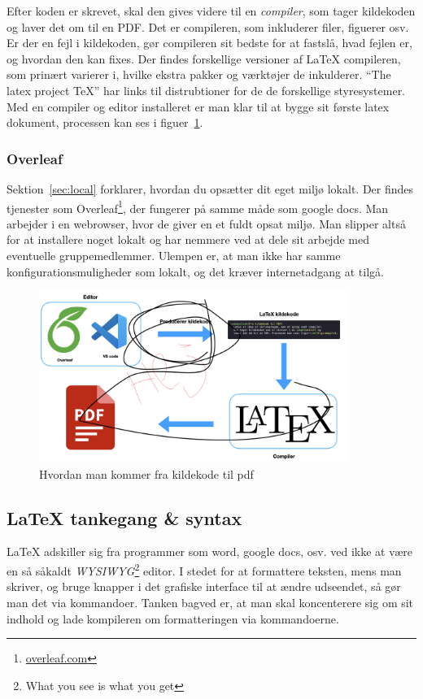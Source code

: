 \documentclass{article}
\begin{document}
Efter koden er skrevet, skal den gives videre til en \emph{compiler}, som
tager kildekoden og laver det om til en PDF. Det er compileren, som
inkluderer filer, figuerer osv. Er der en fejl i kildekoden, gør compileren
sit bedste for at fastslå, hvad fejlen er, og hvordan den kan fixes. Der findes
forskellige versioner af LaTeX compileren, som prinært varierer i, hvilke
ekstra pakker og værktøjer de inkulderer.
``The latex project TeX''\cite{texLive} har links til distrubtioner for de
de forskellige styresystemer. Med en compiler og editor installeret er man
klar til at bygge sit første latex dokument, processen kan ses i
figuer~\ref{fig:compile}.

\subsubsection{Overleaf}
Sektion~\ref{sec:local} forklarer, hvordan du opsætter dit eget miljø lokalt.
Der findes tjenester som Overleaf\footnote{\url{overleaf.com}}, der fungerer
på samme måde som google docs. Man arbejder i en webrowser, hvor de giver en et fuldt opsat
miljø. Man slipper altså for at installere noget lokalt og har nemmere ved
at dele sit arbejde med eventuelle gruppemedlemmer. Ulempen er, at man ikke
har samme konfigurationsmuligheder som lokalt, og det kræver internetadgang
at tilgå.

\begin{figure}[h]
	\centering\includegraphics[width=0.9\textwidth]{assets/compile.png}
	\caption{Hvordan man kommer fra kildekode til pdf}\label{fig:compile}
\end{figure}


\subsection{\LaTeX{} tankegang \& syntax}
\LaTeX{} adskiller sig fra programmer som word, google docs, osv. ved ikke at
være en så såkaldt \emph{WYSIWYG}\footnote{What you see is what you get} editor.
I stedet for at formattere teksten, mens man skriver, og bruge knapper i det grafiske
interface til at ændre udseendet, så gør man det via kommandoer. Tanken bagved er, at man
skal koncenterere sig om sit indhold og lade kompileren om formatteringen via
kommandoerne.
\end{document}
